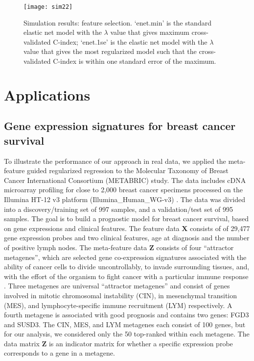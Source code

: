 \begin{figure}
    \centering
    \texttt{[image: sim22]}
    \caption[Simulation results (meta guided): feature selection]{Simulation results: feature selection. `enet.min' is the standard elastic net model with the $\lambda$ value that gives maximum cross-validated C-index; `enet.1se' is the elastic net model with the $\lambda$ value that gives the most regularized model such that the cross-validated C-index is within one standard error of the maximum.}
    \label{fig:sim22}
\end{figure}

\section{Applications}
\subsection{Gene expression signatures for breast cancer survival}
To illustrate the performance of our approach in real data, we applied the meta-feature guided regularized regression to the Molecular Taxonomy of Breast Cancer International Consortium (METABRIC) study. The data includes cDNA microarray profiling for close to 2,000 breast cancer specimens processed on the Illumina HT-12 v3 platform (Illumina\_Human\_WG-v3) \citep{curtis2012genomic}. The data was divided into a discovery/training set of 997 samples, and a validation/test set of 995 samples. The goal is to build a prognostic model for breast cancer survival, based on gene expressions and clinical features. The feature data $\bm{X}$ consists of of 29,477 gene expression probes and two clinical features, age at diagnosis and the number of positive lymph nodes. The meta-feature data $\bm{Z}$ consists of four ``attractor metagenes'', which are selected gene co-expression signatures  associated with the ability of cancer cells to divide uncontrollably, to invade surrounding tissues, and, with the effort of the organism to fight cancer with a particular immune response \citep{cheng2013biomolecular}. Three metagenes are universal “attractor metagenes” and consist of  genes involved in mitotic chromosomal instability (CIN), in mesenchymal transition (MES), and lymphocyte-specific immune recruitment (LYM) respectively. A fourth metagene is associated with good prognosis and contains two genes: FGD3 and SUSD3. The CIN, MES, and LYM metagenes each consist of 100 genes, but for our analysis, we considered only the 50 top-ranked within each metagene. The data matrix $\bm{Z}$ is an indicator matrix for whether a specific expression probe corresponds to a gene in a metagene. 

